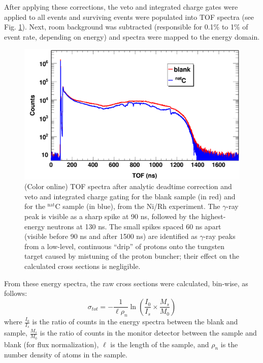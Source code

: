 \documentclass[twocolumn,secnumarabic,amssymb, nobibnotes, aps, prl,
superscriptaddress, nobalancelastpage, draft]{revtex4}
\newcommand{\tot}{\ensuremath{\sigma_{tot}}}
\begin{document}
After applying these corrections, the veto and integrated charge gates were applied to 
all events and surviving events were populated into TOF spectra (see Fig.
\ref{ExampleTOFSpectrum}). Next, room background was subtracted (responsible for 0.1\% to 
1\% of event rate, depending on energy) and spectra were mapped to the energy domain.
\begin{figure}
    \includegraphics[width=\linewidth]{figures/exampleTOFSpectrum.png}
    \caption{(Color online) TOF spectra after analytic deadtime correction and
        veto and integrated charge gating for the blank sample (in
        red) and for the $^{\text{nat}}$C sample (in blue), from the Ni/Rh experiment.
        The $\gamma$-ray peak is visible as a sharp spike at 90 ns, followed by
        the highest-energy neutrons at 130 ns. The small spikes spaced 60 ns
        apart (visible before 90 ns and after 1500
        ns) are identified as $\gamma$-ray peaks from a low-level, continuous
        ``drip'' 
        of protons onto the tungsten target caused by mistuning of the proton 
        buncher; their effect on the calculated cross sections is negligible.
    }
    \label{ExampleTOFSpectrum}
\end{figure}

From these energy spectra, the raw cross sections were calculated, bin-wise, as follows:
$$
\tot = -\frac{1}{\ell\rho_{n}}
\ln \left(\frac{I_{0}}{I_{s}}\times\frac{M_{s}}{M_{0}}\right)
$$
where $\frac{I_{0}}{I_{s}}$ is the ratio of counts in the energy spectra between 
the blank and sample, $\frac{M_{s}}{M_{0}}$ is the ratio of counts in the
monitor detector between the sample and blank (for flux normalization), $\ell$ is the length 
of the sample, and $\rho_{n}$ is the number density of atoms in the sample.
\end{document}
